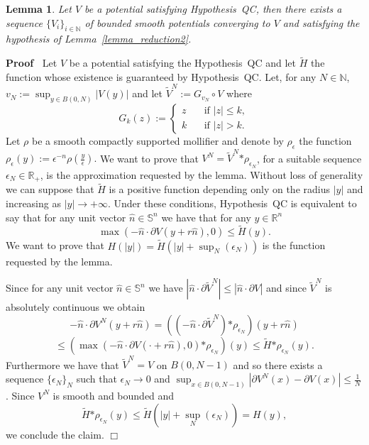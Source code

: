 \documentclass[a4paper,10pt]{article}
\newcommand{\assign}{:=}
\newcommand{\asterisk}{\mathord{*}}
\newenvironment{proof}{\noindent\textbf{Proof\ }}{\hspace*{\fill}$\Box$\medskip}
\newtheorem{lemma}[theorem]{Lemma}
\begin{document}
\begin{lemma}
  \label{lemma_reduction3}Let $V$ be a potential satisfying Hypothesis~QC,
  then there exists a sequence $\{ V_i \}_{i \in \mathbb{N}}$ of bounded
  smooth potentials converging to $V$ and satisfying the hypothesis of
  Lemma~\ref{lemma_reduction2}. 
\end{lemma}

\begin{proof}
  Let $V$ be a potential satisfying the Hypothesis~QC and let $\tilde{H}$ the
  function whose existence is guaranteed by Hypothesis~QC. Let, for any $N \in
  \mathbb{N}$, $v_N \assign \sup_{y \in B (0, N)} | V (y) |$ and let
  $\tilde{V}^N \assign G_{v_N} \circ V$ where
  \[ G_k (z) \assign \left\{\begin{array}{ll}
       z \quad & \text{if $| z | \leqslant k$},\\
       k & \text{if $| z | > k$} .
     \end{array}\right. \]
  Let $\rho$ be a smooth compactly supported mollifier and denote by
  $\rho_{\epsilon}$ the function $\rho_{\epsilon} (y) \assign \epsilon^{- n}
  \rho \left( \frac{y}{\epsilon} \right) .$ We want to prove that $V^N =
  \tilde{V}^N \asterisk \rho_{\epsilon_N}$, for a suitable sequence
  $\epsilon_N \in \mathbb{R}_+$, is the approximation requested by the lemma.
  Without loss of generality we can suppose that $\tilde{H}$ is a positive
  function depending only on the radius $| y |$ and increasing as $| y |
  \rightarrow + \infty$. Under these conditions, Hypothesis~QC is equivalent
  to say that for any unit vector $\hat{n} \in \mathbb{S}^n$ we have that for
  any $y \in \mathbb{R}^n$
  \[ \max (- \hat{n} \cdot \partial V (y + r \hat{n}), 0) \leqslant \tilde{H}
     (y) . \]
  We want to prove that $H (| y |) = \tilde{H} (| y | + \sup_N (\epsilon_N))$
  is the function requested by the lemma.
  
  Since for any unit vector $\hat{n} \in \mathbb{S}^n$ we have $| \hat{n}
  \cdot \partial \tilde{V}^N | \leqslant | \hat{n} \cdot \partial V|$ and
  since $\tilde{V}^N$ is absolutely continuous we obtain
  \[ - \hat{n} \cdot \partial V^N (y + r \hat{n}) = ((- \hat{n} \cdot \partial
     \tilde{V}^N) \asterisk \rho_{\epsilon_N}) (y + r \hat{n}) \]
  \[ \leqslant (\max (- \hat{n} \cdot \partial V (\cdot + r \hat{n}), 0)
     \asterisk \rho_{\epsilon_N}) (y) \leqslant \tilde{H} \asterisk
     \rho_{\epsilon_N} (y) . \]
  Furthermore we have that $\tilde{V}^N = V$ on $B (0, N - 1)$ and so there
  exists a sequence $\{ \epsilon_N \}_N$ such that $\epsilon_N \rightarrow 0$
  and $\sup_{x \in B (0, N - 1)} | \partial V^N (x) - \partial V (x) |
  \leqslant \frac{1}{N}$. Since $V^N$ is smooth and bounded and
  \[ \tilde{H} \asterisk \rho_{\epsilon_N} (y) \leqslant \tilde{H} (| y | +
     \sup_N (\epsilon_N)) = H (y), \]
  we conclude the claim.
\end{proof}
\end{document}
